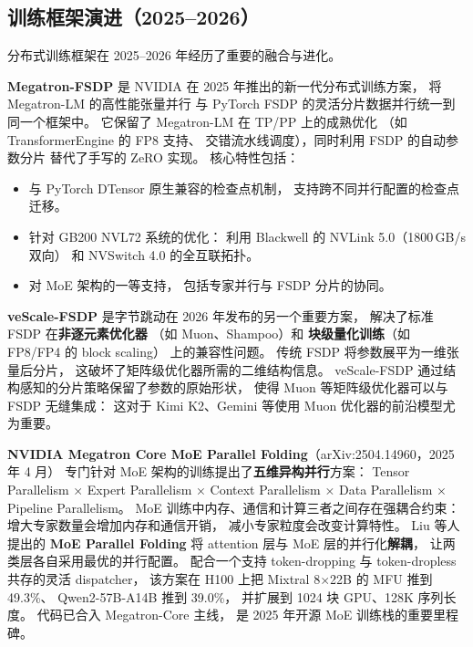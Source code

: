 \subsection{训练框架演进（2025--2026）}

分布式训练框架在 2025--2026 年经历了重要的融合与进化。

\textbf{Megatron-FSDP}
是 NVIDIA 在 2025 年推出的新一代分布式训练方案，%
将 Megatron-LM 的高性能张量并行
与 PyTorch FSDP 的灵活分片数据并行统一到同一个框架中。
它保留了 Megatron-LM 在 TP/PP 上的成熟优化
（如 TransformerEngine 的 FP8 支持、
交错流水线调度），同时利用 FSDP 的自动参数分片
替代了手写的 ZeRO 实现。
核心特性包括：
\begin{itemize}[noitemsep]
  \item 与 PyTorch DTensor 原生兼容的检查点机制，
        支持跨不同并行配置的检查点迁移。
  \item 针对 GB200 NVL72 系统的优化：
        利用 Blackwell 的 NVLink 5.0（1800\,GB/s 双向）
        和 NVSwitch 4.0 的全互联拓扑。
  \item 对 MoE 架构的一等支持，
        包括专家并行与 FSDP 分片的协同。
\end{itemize}

\textbf{veScale-FSDP} 是字节跳动在 2026 年发布的另一个重要方案，%
解决了标准 FSDP 在\textbf{非逐元素优化器}
（如 Muon、Shampoo）和
\textbf{块级量化训练}（如 FP8/FP4 的 block scaling）
上的兼容性问题。
传统 FSDP 将参数展平为一维张量后分片，
这破坏了矩阵级优化器所需的二维结构信息。
veScale-FSDP 通过结构感知的分片策略保留了参数的原始形状，
使得 Muon 等矩阵级优化器可以与 FSDP 无缝集成：
这对于 Kimi K2、Gemini 等使用 Muon 优化器的前沿模型尤为重要。

\textbf{NVIDIA Megatron Core MoE Parallel Folding}（arXiv:2504.14960，2025 年 4 月）%
专门针对 MoE 架构的训练提出了\textbf{五维异构并行}方案：
Tensor Parallelism × Expert Parallelism × Context Parallelism ×
Data Parallelism × Pipeline Parallelism。
MoE 训练中内存、通信和计算三者之间存在强耦合约束：
增大专家数量会增加内存和通信开销，
减小专家粒度会改变计算特性。
Liu 等人提出的 \textbf{MoE Parallel Folding}
将 attention 层与 MoE 层的并行化\textbf{解耦}，
让两类层各自采用最优的并行配置。
配合一个支持 token-dropping 与 token-dropless 共存的灵活 dispatcher，
该方案在 H100 上把 Mixtral 8$\times$22B 的 MFU 推到 49.3\%、
Qwen2-57B-A14B 推到 39.0\%，
并扩展到 1024 块 GPU、128K 序列长度。
代码已合入 Megatron-Core 主线，
是 2025 年开源 MoE 训练栈的重要里程碑。

